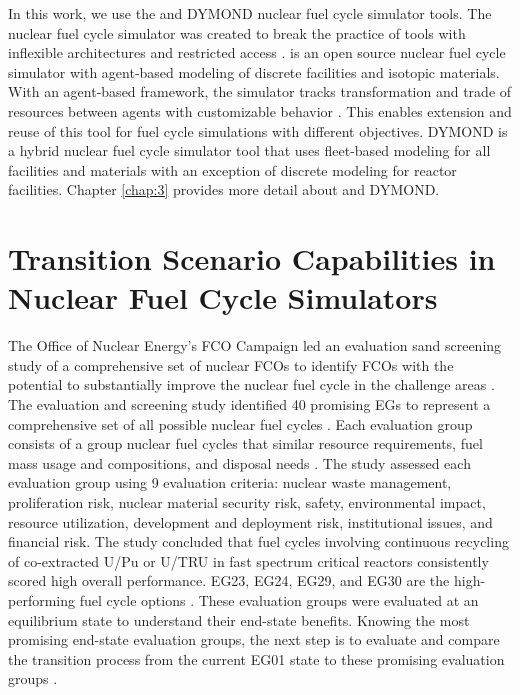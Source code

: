 In this work, we use the \Cyclus and DYMOND nuclear fuel cycle simulator tools. 
The \Cyclus nuclear fuel cycle simulator was created to break the practice of 
tools with inflexible architectures and restricted access \cite{huff_fundamental_2016}.
\Cyclus is an open source nuclear fuel cycle simulator with agent-based 
modeling of discrete facilities and isotopic materials. 
With an agent-based framework, the simulator tracks transformation and 
trade of resources between agents with customizable behavior
\cite{huff_fundamental_2016}. 
This enables extension and reuse of this tool for fuel cycle 
simulations with different objectives. 
DYMOND is a hybrid nuclear fuel cycle simulator tool that uses fleet-based 
modeling for all facilities and materials 
with an exception of discrete modeling for reactor facilities. 
Chapter \ref{chap:3} provides more detail about \Cyclus and DYMOND. 

\section{Transition Scenario Capabilities in Nuclear Fuel Cycle Simulators}
\label{sec:egs}
The Office of Nuclear Energy's
\gls{FCO} Campaign led an evaluation 
sand screening study of a comprehensive set of nuclear \glspl{FCO} 
to identify \glspl{FCO} with the potential to substantially 
improve the nuclear fuel cycle in the challenge areas
\cite{wigeland_nuclear_2014}. 
The evaluation and screening study identified 40 promising 
\glspl{EG} to represent a comprehensive set of 
all possible nuclear fuel cycles \cite{wigeland_nuclear_2014}. 
Each evaluation group consists of a group nuclear fuel cycles that
similar resource requirements, fuel mass usage and compositions, 
and disposal needs \cite{wigeland_nuclear_2014}. 
The study assessed each evaluation group using 
9 evaluation criteria: nuclear waste management, 
proliferation risk, nuclear material security risk, 
safety, environmental impact, resource utilization, 
development and deployment risk, institutional issues, and 
financial risk.  
The study concluded that fuel cycles
involving continuous recycling of co-extracted U/Pu or U/TRU in 
fast spectrum critical reactors consistently scored high overall 
performance.
EG23, EG24, EG29, and EG30 are the high-performing fuel cycle options
\cite{wigeland_nuclear_2014}.
These evaluation groups were evaluated at an equilibrium state to 
understand their end-state benefits.
Knowing the most promising end-state evaluation groups,
the next step is to evaluate and compare the transition process 
from the current EG01 
state to these promising evaluation groups \cite{feng_standardized_2016}. 

